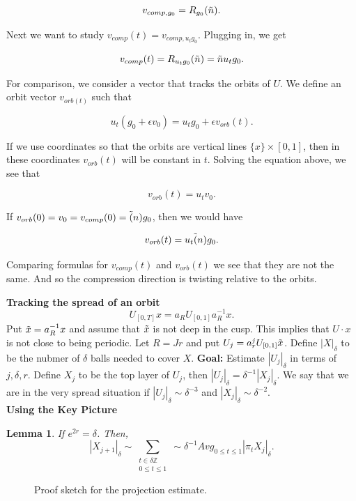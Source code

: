 \documentclass[12pt]{amsart}
\newtheorem{lemma}[theorem]{Lemma}
\newcommand{\Z}{\mathbb{Z}}
\begin{document}
$$ v_{comp, g_0} = R_{g_0}(\Tilde{n}). $$

Next we want to study $v_{comp}(t) = v_{comp,  u_t g_0}$.   Plugging in,  we get

$$v_{comp}(t)=R_{u_tg_0}(\Tilde{n})=\Tilde{n}u_tg_0. $$

For comparison,  we consider a vector that tracks the orbits of $U$.   We define an orbit vector $v_{orb(t)}$ such that 

$$u_t(g_0+\epsilon v_0)=u_tg_0+\epsilon v_{orb}(t). $$

 If we use coordinates so that the orbits are vertical lines $\{ x \} \times [0,1]$,  then in these coordinates $v_{orb}(t)$ will be constant in $t$.   Solving the equation above,  we see that
 
 $$ v_{orb}(t) = u_t v_0. $$
 
 If $v_{orb}(0) = v_0 = v_{comp}(0) = \Tilde(n)g_0$,  then we would have
 
 $$ v_{orb}(t) = u_t \Tilde(n) g_0. $$
 
 Comparing formulas for $v_{comp}(t)$ and $v_{orb}(t)$ we see that they are not the same.   And so the compression direction is twisting relative to the orbits.



\textbf{Tracking the spread of an orbit}
$$U_{[0,T]}x=a_RU_{[0,1]}a_R^{-1}x.$$
Put $\Tilde{x}=a_R^{-1}x$ and assume that $\Tilde{x}$ is not deep in the cusp. This implies that $U\cdot x$ is not close to being periodic. Let $R=Jr$ and put $U_j=a_r^jU_{[0,1]}\Tilde{x}$. 
Define $|X|_\delta$ to be the nubmer of $\delta$ balls needed to cover $X$. 
\textbf{Goal:} Estimate $|U_j|_\delta$ in terms of $j, \delta, r$. Define $X_j$ to be the top layer of $U_j$, then $|U_j|_\delta=\delta^{-1}|X_j|_\delta$. We say that we are in the very spread situation if $|U_j|_\delta\sim \delta^{-3}$ and $|X_j|_\delta\sim \delta^{-2}$. \\
\textbf{Using the Key Picture}\\
\begin{lemma}
    If $e^{2r}=\delta$. Then, 
    $$|X_{j+1}|_\delta\sim \sum_{\substack{t \in \delta \Z\\ 0 \leq t \leq 1}} \sim \delta^{-1}Avg_{0 \leq t \leq 1} |\pi_t X_j|_\delta.$$
\end{lemma}
\begin{figure}[h]
    \centering
    
    \caption{Proof sketch for the projection estimate.}
    \label{fig:may1p2}
\end{figure}
\end{document}
